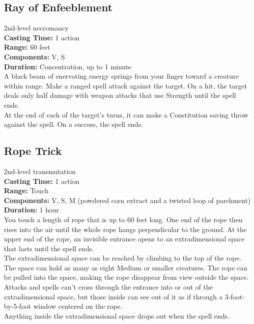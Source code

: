 \documentclass[11pt, A4paper, english]{article}
\begin{document}
		\subsection{Ray of Enfeeblement}
2nd-level necromancy \\
\textbf{Casting Time:} 1 action \\
\textbf{Range:} 60 feet \\
\textbf{Components:} V, S \\
\textbf{Duration:} Concentration, up to 1 minute \\
A black beam of enervating energy springs from your finger toward a creature within range. Make a ranged spell attack against the target. On a hit, the target deals only half damage with weapon attacks that use Strength until the spell ends. \\
At the end of each of the target’s turns, it can make a Constitution saving throw against the spell. On a success, the spell ends.

		\subsection{Rope Trick}
2nd-level transmutation \\
\textbf{Casting Time:} 1 action \\
\textbf{Range:} Touch \\
\textbf{Components:} V, S, M (powdered corn extract and a twisted loop of parchment) \\
\textbf{Duration:} 1 hour \\
You touch a length of rope that is up to 60 feet long. One end of the rope then rises into the air until the whole rope hangs perpendicular to the ground. At the upper end of the rope, an invisible entrance opens to an extradimensional space that lasts until the spell ends. \\
The extradimensional space can be reached by climbing to the top of the rope. The space can hold as many as eight Medium or smaller creatures. The rope can be pulled into the space, making the rope disappear from view outside the space. \\
Attacks and spells can’t cross through the entrance into or out of the extradimensional space, but those inside can see out of it as if through a 3-foot-by-5-foot window centered on the rope. \\
Anything inside the extradimensional space drops out when the spell ends.
\end{document}
